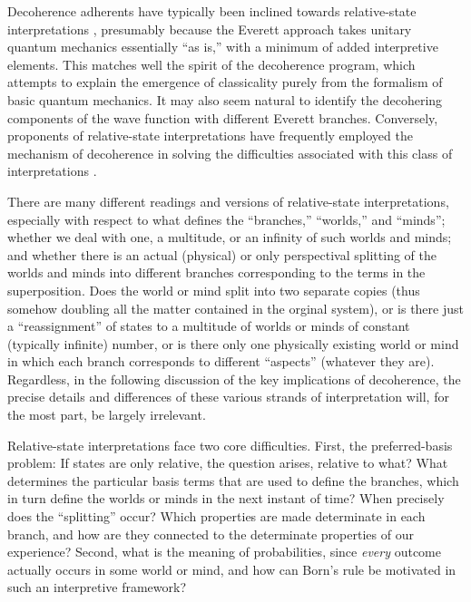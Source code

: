 \documentclass[twocolumn,rmp,aps,amsmath,amsfonts,noshowkeys,noshowpacs]{revtex4}
\begin{document}
Decoherence adherents have typically been inclined towards
relative-state interpretations \citep[for
instance][]{Zeh:1970:yt,Zeh:1973:wq,Zeh:1993:lt,Zurek:1998:re},
presumably because the Everett approach takes unitary quantum
mechanics essentially ``as is,'' with a minimum of added interpretive
elements. This matches well the spirit of the decoherence program,
which attempts to explain the emergence of classicality purely from
the formalism of basic quantum mechanics. It may also seem natural to
identify the decohering components of the wave function with different
Everett branches. Conversely, proponents of relative-state
interpretations have frequently employed the mechanism of decoherence
in solving the difficulties associated with this class of
interpretations \citep[see, for
example,][]{Saunders:1995:zx,Saunders:1997:za,Saunders:1998:rc,%
Deutsch:1985:rx,Deutsch:1996:fz,Deutsch:2001:aq,Vaidmain:1998:zp,%
Wallace:2003:iq,Wallace:2003:iz}.

There are many different readings and versions of relative-state
interpretations, especially with respect to what defines the
``branches,'' ``worlds,'' and ``minds''; whether we deal with one, a
multitude, or an infinity of such worlds and minds; and whether there
is an actual (physical) or only perspectival splitting of the worlds
and minds into different branches corresponding to the terms in the
superposition. Does the world or mind split into two separate copies
(thus somehow doubling all the matter contained in the orginal
system), or is there just a ``reassignment'' of states to a multitude
of worlds or minds of constant (typically infinite) number, or is
there only one physically existing world or mind in which each branch
corresponds to different ``aspects'' (whatever they are). Regardless,
in the following discussion of the key implications of decoherence,
the precise details and differences of these various strands of
interpretation will, for the most part, be largely irrelevant.

Relative-state interpretations face two core difficulties. First, the
preferred-basis problem: If states are only relative, the question
arises, relative to what? What determines the particular basis terms
that are used to define the branches, which in turn define the worlds
or minds in the next instant of time? When precisely does the
``splitting'' occur?  Which properties are made determinate in each
branch, and how are they connected to the determinate properties of
our experience? Second, what is the meaning of probabilities, since
\emph{every} outcome actually occurs in some world or mind, and how
can Born's rule be motivated in such an interpretive framework?
\end{document}
